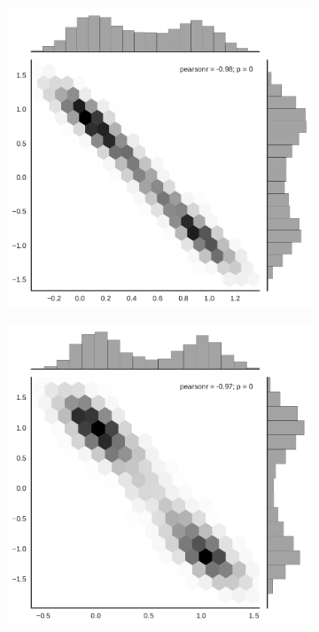 \documentclass{article}
\begin{document}
\begin{figure}
\begin{subfigure}{.5\textwidth}
\includegraphics[width=\textwidth]{./img/mcmc_sample.pdf}
\end{subfigure}%
\begin{subfigure}{.5\textwidth}
\includegraphics[width=\textwidth]{./img/sgld_sample.pdf}
\end{subfigure}%
\end{figure}
\end{document}
